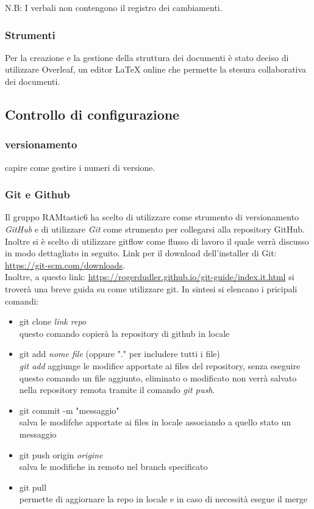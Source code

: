 \documentclass[12pt, oneside]{article}
\begin{document}
N.B: I verbali non contengono il registro dei cambiamenti.

\subsubsection{Strumenti}
Per la creazione e la gestione della struttura dei documenti è stato deciso di utilizzare Overleaf, un editor LaTeX online che permette la stesura collaborativa dei documenti.

\subsection{Controllo di configurazione}
\subsubsection{versionamento}
capire come gestire i numeri di versione.
\subsubsection{Git e Github}
Il gruppo RAMtastic6 ha scelto di utilizzare come strumento di versionamento \emph{GitHub} e di utilizzare \emph{Git} come strumento per collegarsi alla repository GitHub.
Inoltre si è scelto di utilizzare gitflow come flusso di lavoro il quale verrà discusso in modo dettagliato in seguito.
Link per il download dell'installer di Git: \url{https://git-scm.com/downloads}.\\
Inoltre, a questo link: \url{https://rogerdudler.github.io/git-guide/index.it.html} si troverà una breve guida su come utilizzare git.
In sintesi si elencano i pricipali comandi:
\begin{itemize}
    \item git clone \emph{link repo}\\
    questo comando copierà la repository di github in locale
    \item git add \emph{nome file} (oppure "." per includere tutti i file)\\
    \emph{git add} aggiunge le modifice apportate ai files del repository, senza eseguire questo comando un file aggiunto, eliminato o modificato non verrà salvato nella repository remota tramite il comando \emph{git push}.
    \item git commit -m "messaggio" \\
    salva le modifche apportate ai files in locale associando a quello stato un messaggio
    \item git push origin \emph{origine} \\
    salva le modifiche in remoto nel branch specificato
    \item git pull \\
    permette di aggiornare la repo in locale e in caso di necessità esegue il merge
\end{itemize}
\end{document}
